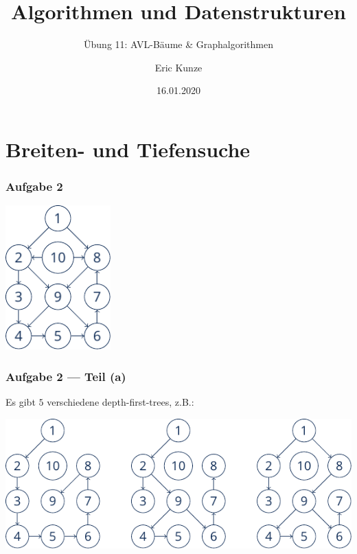 \documentclass{beamer}
\begin{document}
	
	\title{Algorithmen und Datenstrukturen}
	\subtitle{Übung 11: AVL-Bäume \& Graphalgorithmen}
	\author{Eric Kunze}
	\date{16.01.2020}

	\maketitle






\section{Breiten- und Tiefensuche}

\begin{frame} \frametitle{Aufgabe 2}
	\centering
	\includegraphics[height=15em]{./tut11_task2-graph.pdf}
\end{frame}

\begin{frame} \frametitle{Aufgabe 2 --- Teil (a)}
	Es gibt $5$ verschiedene depth-first-trees, z.B.:
	
	\includegraphics[width=\linewidth]{./tut11_task2-dft.pdf}
\end{frame}
\end{document}
